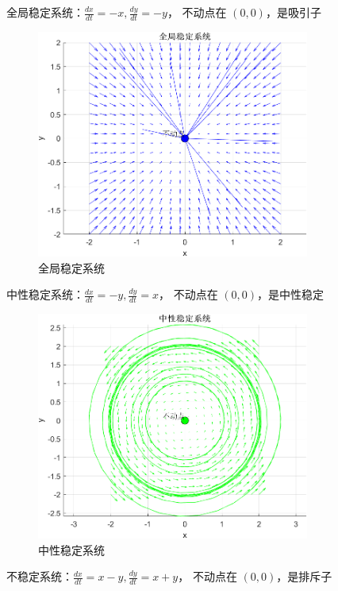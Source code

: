 全局稳定系统：$\frac{dx}{dt}=-x,\frac{dy}{dt}=-y$， 不动点在 $(0, 0)$，是吸引子
\begin{figure}[H]
    \centering
    \includegraphics[width=0.8\textwidth]{Img/fix5.png}
    \caption{全局稳定系统}
    \label{fig:global_stable}
\end{figure}
中性稳定系统：$\frac{dx}{dt}=-y,\frac{dy}{dt}=x$， 不动点在 $(0, 0)$，是中性稳定
\begin{figure}[H]
    \centering
    \includegraphics[width=0.8\textwidth]{Img/fix4.png}
    \caption{中性稳定系统}
    \label{fig:neutral_stable}
\end{figure}
不稳定系统：$\frac{dx}{dt}=x-y,\frac{dy}{dt}=x+y$， 不动点在 $(0, 0)$，是排斥子
